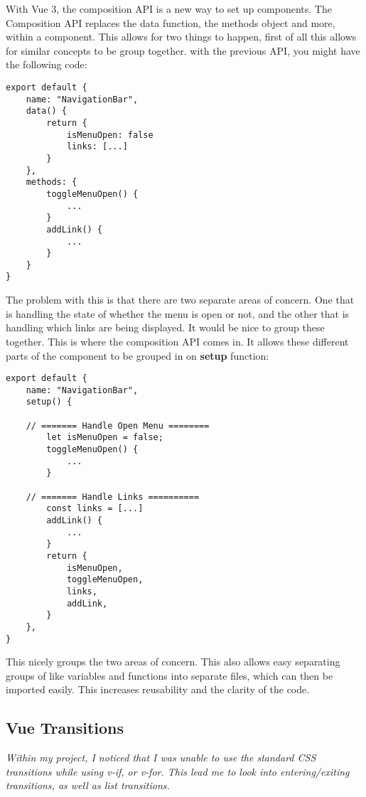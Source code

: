 \documentclass[portfolio.tex]{subfiles}
\begin{document}
			With Vue 3, the composition API is a new way to set up components. The Composition API replaces the data function, the methods object  and more, within a component. This allows for two things to happen, first of all this allows for similar concepts to be group together. with the previous API, you might have the following code:\\

			\begin{lstlisting}
export default {
	name: "NavigationBar",
	data() {
		return {
			isMenuOpen: false
			links: [...]
		}
	},
	methods: {
		toggleMenuOpen() {
			...
		}
		addLink() {
			...
		}
	}
}
			\end{lstlisting}

		The problem with this is that there are two separate areas of concern. One that is handling the state of whether the menu is open or not, and the other that is handling which links are being displayed. It would be nice to group these together. This is where the composition API comes in. It allows these different parts of the component to be grouped in on \textbf{setup} function:\\

		\begin{lstlisting}
export default {
	name: "NavigationBar",
	setup() {

	// ======= Handle Open Menu ========
		let isMenuOpen = false;
		toggleMenuOpen() {
			...
		}

	// ======= Handle Links ==========
		const links = [...]
		addLink() {
			...
		}
		return {
			isMenuOpen,
			toggleMenuOpen,
			links,
			addLink,
		}
	},
}
		\end{lstlisting}

		This nicely groups the two areas of concern. This also allows easy separating groups of like variables and functions into separate files, which can then be imported easily. This increases reusability and the clarity of the code.\\

		\autocite{vue-composition}

		\subsection{Vue Transitions}
			\textit{Within my project, I noticed that I was unable to use the standard CSS transitions while using v-if, or v-for. This lead me to look into entering/exiting transitions, as well as list transitions.}\\
\end{document}
